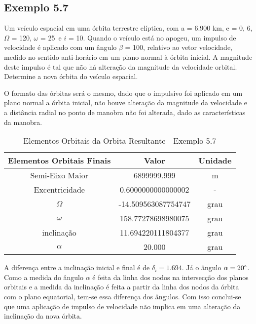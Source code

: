 \subsection{Exemplo 5.7}

Um veículo espacial em uma órbita terrestre elíptica, com a = 6.900 km, e = 0, 6, $\Omega$ = 120\degree, $\omega$ = 25\degree \ e $i$ = 10\degree. Quando o veículo está no apogeu, um impulso de velocidade é aplicado com um ângulo $\beta$ = 100\degree , relativo ao vetor velocidade, medido no sentido anti-horário em um plano normal à órbita inicial. A magnitude deste impulso é tal que não há alteração da magnitude da velocidade orbital. Determine a nova órbita do veículo espacial.

\par O formato das órbitas será o mesmo, dado que o impulsivo foi aplicado em um plano normal a órbita inicial, não houve alteração da magnitude da velocidade e a distância radial no ponto de manobra não foi alterada, dado as características da manobra. 

\begin{table}[h]
\centering
\caption{Elementos Orbitais da Orbita Resultante - Exemplo 5.7}
\label{tab ex57}
\begin{tabular}{|c|c|c|}
\hline
Elementos Orbitais Finais & Valor               & Unidade \\ \hline
Semi-Eixo Maior                         & 6899999.999         & m       \\ \hline
Excentricidade                        & 0.6000000000000002  & -       \\ \hline
$\Omega$                  & -14.509563087754747 & grau    \\ \hline
$\omega$                     & 158.77278698980075  & grau    \\ \hline
inclinação                       & 11.694220111804377  & grau    \\ \hline
$\alpha$                     & 20.000              & grau    \\ \hline
\end{tabular}%

\end{table}

\par A diferença entre a inclinação inicial e final é de $\delta_i=1.694$. Já o ângulo $\alpha=20\degree$. Como a medida do ângulo $\alpha$ é feita da linha dos nodos na intersecção dos planos orbitais e a medida da inclinação é feita a partir da linha dos nodos da órbita com o plano equatorial, tem-se essa diferença dos ângulos. Com isso conclui-se que uma aplicação de impulso de velocidade não implica em uma alteração da inclinação da nova órbita.